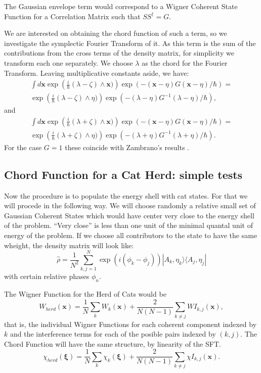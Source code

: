 \documentclass[a4paper,12pt]{article}
\newcommand{\ihb}{\frac{i}{\hbar}}
\newcommand{\xfase}{\mathbf{x}}
\newcommand{\xifase}{ {\boldsymbol{\xi}} }
\newcommand{\bra}[1]{\langle #1|}
\newcommand{\ket}[1]{|#1\rangle}
\begin{document}
The Gaussian envelope term would correspond to a Wigner Coherent State
Function for a Correlation Matrix such that $SS^\dagger=G$.

We are interested
on obtaining the chord function of such a term, so we investigate
the symplectic Fourier Transform of it.
As this term is the sum of the contributions from the cross terms
of the density matrix, for simplicity we transform each one separately.
We choose $\lambda$ as the chord for the Fourier Transform.
Leaving multiplicative constants aside, we have:
\begin{multline}
\int d \xfase \exp \left(\ihb (\lambda-\zeta)\wedge \xfase) \right)
\exp \left( -(\xfase-\eta)G (\xfase-\eta)/\hbar \right) =\\
\exp \left(\ihb (\lambda-\zeta)\wedge \eta) \right)
\exp \left( -(\lambda-\eta)G^{-1}(\lambda-\eta)/\hbar \right),
\end{multline}
and
\begin{multline}
\int d \xfase \exp \left(\ihb (\lambda+\zeta)\wedge \xfase) \right)
\exp \left( -(\xfase-\eta)G (\xfase-\eta)/\hbar \right) =\\
\exp \left(\ihb (\lambda+\zeta)\wedge \eta) \right)
\exp \left( -(\lambda+\eta)G^{-1}(\lambda+\eta)/\hbar \right).
\end{multline}
For the case $G=1$ these coincide with Zambrano's results 
\cite{tesiseduardo}.

\subsection{Chord Function for a Cat Herd: simple tests}

Now the procedure is to populate the energy shell with cat states. For that
we will procede in the following way. We will choose randomly a relative
small set of Gaussian Coherent States which would have center very
close to the energy shell of the problem. ``Very close'' is
less than  one unit of the minimal quantal unit of energy of the problem.
If we choose all contributors to the state to have the same wheight,
the density matrix will look like:
\begin{equation}
\hat{\rho}=\frac{1}{N^2}\sum_{k,j=1}^{N}
\exp(i(\phi_k-\phi_j))\ket{A_k,\eta_k}\bra{A_j, \eta_j}
\end{equation}
with certain relative phases $\phi_n$.

The Wigner Function for the Herd of Cats would be
\begin{equation}
W_{herd}(\xfase)=\frac{1}{N}\sum_k W_k(\xfase)
+\frac{2}{N(N-1)}\sum_{k\neq j}WI_{k,j}(\xfase),
\end{equation}
that is, the individual Wigner Functions for each coherent
component indexed by $k$ and the interference terms for each of the
posible pairs indexed by $(k,j)$. The Chord Function will have
the same structure, by linearity of the SFT. 
\begin{equation}
\chi_{herd}(\xifase)=\frac{1}{N}\sum_k \chi_k(\xifase)
+\frac{2}{N(N-1)}\sum_{k\neq j}\chi I_{k,j}(\xfase).
\end{equation}
\end{document}
